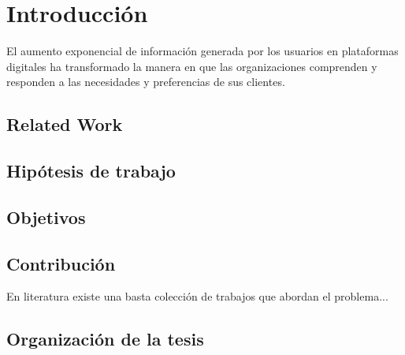 \chapter{Introducción}

El aumento exponencial de información generada por los usuarios en plataformas digitales ha transformado la manera en que las organizaciones comprenden y responden a las necesidades y preferencias de sus clientes.

\section{Related Work}

\section{Hipótesis de trabajo} \label{sec:hypothesis}

\section{Objetivos} \label{sec:objective}

\section{Contribución} \label{sec:contribution}

En literatura existe una basta colección de trabajos que abordan el problema...

\section{Organización de la tesis}






